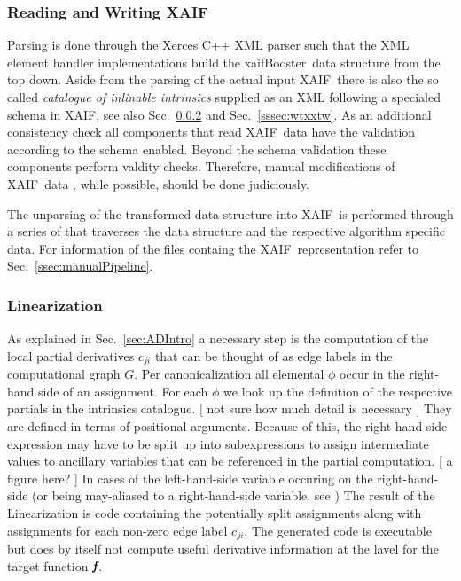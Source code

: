 \documentclass[11pt]{article}
\newcommand{\xaif}{XAIF}
\newcommand{\xaifBooster}{xaifBooster}
\newcommand{\bmf}{\mbox{\bf\em f}}
\newcommand{\refsec}[1]{{Sec.~\ref{#1}}}
\begin{document}
\subsubsection{Reading and Writing \xaif}
Parsing is done through the Xerces C++ XML parser \cite{xercesWeb}
such that the XML element handler implementations build the \xaifBooster\ data 
structure 
from the top down. 
Aside from the parsing of the actual input \xaif\ there is also the so called 
{\em 
catalogue of inlinable intrinsics
} 
supplied as an XML following a specialed schema in \xaif, see also 
\refsec{sssec:linearization} and \refsec{sssec:wtxxtw}.
As an additional consistency check all components that read \xaif\ data 
have the validation according to the schema enabled. Beyond the schema 
validation these components perform valdity checks. Therefore, 
manual modifications of \xaif\ data , while possible, should 
be done judiciously. 

The unparsing of the transformed data structure into \xaif\ is performed 
through a series of that traverses the data structure and the 
respective algorithm specific data. 
For information of the files containg the \xaif\ representation refer to 
\refsec{ssec:manualPipeline}.

\subsubsection{Linearization}\label{sssec:linearization}

As explained in \refsec{sec:ADIntro} a necessary step is the computation of 
the local partial derivatives $c_{ji}$ that can be thought of as edge labels 
in the computational graph $G$. Per canonicalization all elemental $\phi$ 
occur in the right-hand side of an assignment. 
For each $\phi$ we look up the definition of the respective partials in 
the intrinsics catalogue. 
{\color{red} [ not sure  how much detail is necessary ] } 
They are defined in terms of positional arguments. Because of this, 
the right-hand-side expression may have to be split up into 
subexpressions to assign intermediate values to ancillary variables 
that can be referenced in the partial computation.  
{\color{red} [ a figure here? ] }
In cases of the left-hand-side variable occuring on the right-hand-side (or being 
may-aliased to a right-hand-side variable, see )
The result of the Linearization is code containing the potentially split 
assignments along with assignments for each non-zero edge label $c_{ji}$.
The generated code is executable but does by itself not compute useful 
derivative information at the lavel for the target function $\bmf$.
 
\end{document}
